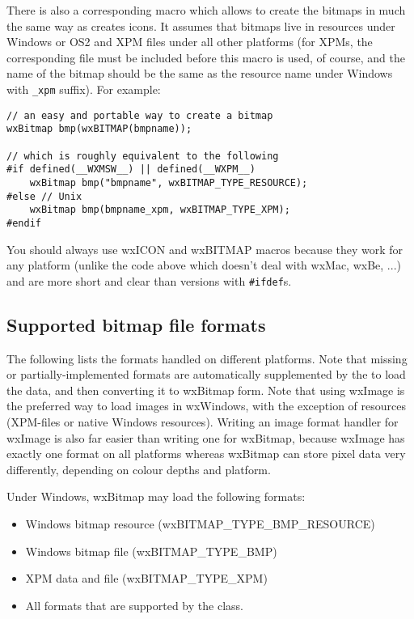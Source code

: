 There is also a corresponding  macro which allows
to create the bitmaps in much the same way as  creates
icons. It assumes that bitmaps live in resources under Windows or OS2 and XPM
files under all other platforms (for XPMs, the corresponding file must be
included before this macro is used, of course, and the name of the bitmap
should be the same as the resource name under Windows with {\tt \_xpm}
suffix). For example:

\begin{verbatim}
// an easy and portable way to create a bitmap
wxBitmap bmp(wxBITMAP(bmpname));

// which is roughly equivalent to the following
#if defined(__WXMSW__) || defined(__WXPM__)
    wxBitmap bmp("bmpname", wxBITMAP_TYPE_RESOURCE);
#else // Unix
    wxBitmap bmp(bmpname_xpm, wxBITMAP_TYPE_XPM);
#endif
\end{verbatim}

You should always use wxICON and wxBITMAP macros because they work for any
platform (unlike the code above which doesn't deal with wxMac, wxBe, ...) and
are more short and clear than versions with {\tt \#ifdef}s.

\subsection{Supported bitmap file formats}\label{supportedbitmapformats}

The following lists the formats handled on different platforms. Note
that missing or partially-implemented formats are automatically supplemented
by the  to load the data, and then converting
it to wxBitmap form. Note that using wxImage is the preferred way to
load images in wxWindows, with the exception of resources (XPM-files or
native Windows resources). Writing an image format handler for wxImage
is also far easier than writing one for wxBitmap, because wxImage has
exactly one format on all platforms whereas wxBitmap can store pixel data
very differently, depending on colour depths and platform.


Under Windows, wxBitmap may load the following formats:

\begin{itemize}\itemsep=0pt
\item Windows bitmap resource (wxBITMAP\_TYPE\_BMP\_RESOURCE)
\item Windows bitmap file (wxBITMAP\_TYPE\_BMP)
\item XPM data and file (wxBITMAP\_TYPE\_XPM)
\item All formats that are supported by the  class.
\end{itemize}

